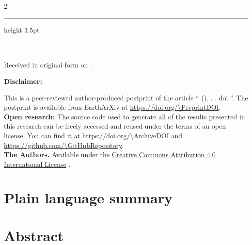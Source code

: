 \documentclass[onecolumn,10pt]{article}
\begin{document}
\thispagestyle{plain}
\begin{FlushLeft}
  \begin{spacing}{2}
    {\LARGE\bfseries \Title}
  \end{spacing}
  {\color{lightgray}\hrule height 1.5pt}
  \vspace{0.3cm}
  \Authors
  \\[0.2cm]
  {\footnotesize \Affiliations}
  \newline
  {\footnotesize \Corresponding}
  \\[0.2cm]
  {\footnotesize
    Received in original form on \SubmittedOn.
  }
\end{FlushLeft}

\begin{summarybox}
  \noindent
  \textbf{Disclaimer:}
  
  This is a peer-reviewed author-produced postprint of the article
  ``\AuthorShort{} (\Year). \Title. \textit{\Journal}.
  doi:\href{https://doi.org/\JournalDOI}{\JournalDOI}''.
  The postprint is available from EarthArXiv at
  \url{https://doi.org/\PreprintDOI}.
  \\[0.25cm]
  \noindent
  \textbf{Open research:}
  The source code used to generate all of the results presented in this
  research can be freely accessed and reused under the terms of an open license.
  You can find it at \url{https://doi.org/\ArchiveDOI} and
  \url{https://github.com/\GitHubRepository}.
  \\[0.25cm]
  \noindent
  \textbf{\textcopyright{} \Year{} The Authors.}
  Available under the \href{https://creativecommons.org/licenses/by/4.0/}{Creative Commons Attribution 4.0 International License}
  \faCreativeCommons\faCreativeCommonsBy{}.
\end{summarybox}

\section*{\normalsize Plain language summary}
\begingroup
   \small  \par
\endgroup

\section*{\normalsize Abstract}
\begingroup
   \small  \par
\endgroup





\end{document}
